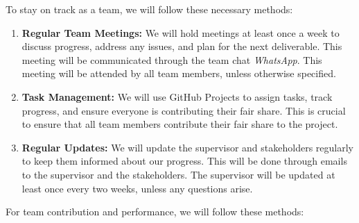 \documentclass{article}
\begin{document}
\iffalse
\wss{What methods will be used to keep the team on track? How will your team
ensure that members contribute as expected to the team and that the team
performs as expected? How will your team reward members who do well and manage
members whose performance is below expectations?  What are the consequences for
someone not contributing their fair share?}

\wss{You may wish to use the project management metrics collected for the TA and
instructor for this.}

\wss{You can set target metrics for attendance, commits, etc.  What are the
consequences if someone doesn't hit their targets?  Do they need to bring the
coffee to the next team meeting?  Does the team need to make an appointment with
their TA, or the instructor?  Are there incentives for reaching targets early?}
\fi

To stay on track as a team, we will follow these necessary methods:

\begin{enumerate}
  \item \textbf{Regular Team Meetings:} We will hold meetings at least once a week to discuss progress, address any issues, and plan for the next deliverable. This meeting will be communicated through the team chat \textit{WhatsApp}. This meeting will be attended by all team members, unless otherwise specified.
  \item \textbf{Task Management:} We will use GitHub Projects to assign tasks, track progress, and ensure everyone is contributing their fair share. This is crucial to ensure that all team members contribute their fair share to the project.
  \item \textbf{Regular Updates:} We will update the supervisor and stakeholders regularly to keep them informed about our progress. This will be done through emails to the supervisor and the stakeholders. The supervisor will be updated at least once every two weeks, unless any questions arise.
\end{enumerate}

For team contribution and performance, we will follow these methods:
\end{document}
